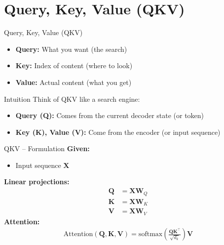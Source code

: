 \section{Query, Key, Value (QKV)}
\begin{frame}{Query, Key, Value (QKV)}
    \begin{itemize}
        \item \textbf{Query:} What you want (the search)
        \item \textbf{Key:} Index of content (where to look)
        \item \textbf{Value:} Actual content (what you get)
    \end{itemize}

    \begin{block}{Intuition}
    Think of QKV like a search engine:
    \begin{itemize}
        \item \textbf{Query (Q):} Comes from the current decoder state (or token)
        \item \textbf{Key (K), Value (V):} Come from the encoder (or input sequence)
    \end{itemize}
    \end{block}
\end{frame}

\begin{frame}{QKV – Formulation}
    \textbf{Given:}
    \begin{itemize}
        \item Input sequence $\mathbf{X}$
    \end{itemize}
    \textbf{Linear projections:}
    \begin{align*}
        \mathbf{Q} &= \mathbf{X} \mathbf{W}_Q \\
        \mathbf{K} &= \mathbf{X} \mathbf{W}_K \\
        \mathbf{V} &= \mathbf{X} \mathbf{W}_V
    \end{align*}
    \textbf{Attention:}
    \begin{align*}
        \text{Attention}(\mathbf{Q}, \mathbf{K}, \mathbf{V}) = \mathrm{softmax}\left( \frac{\mathbf{Q} \mathbf{K}^\top}{\sqrt{d_k}} \right) \mathbf{V}
    \end{align*}
\end{frame}
